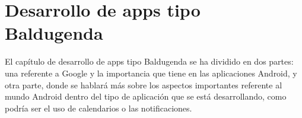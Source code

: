 \chapter{Desarrollo de apps tipo Baldugenda}
\label{ch:desarrollo}

El capítulo de desarrollo de apps tipo Baldugenda se ha dividido en dos partes: una referente a Google y la importancia que tiene en las aplicaciones Android, y otra parte, donde se hablará más sobre los aspectos importantes referente al mundo Android dentro del tipo de aplicación que se está desarrollando, como podría ser el uso de calendarios o las notificaciones.




\newpage























